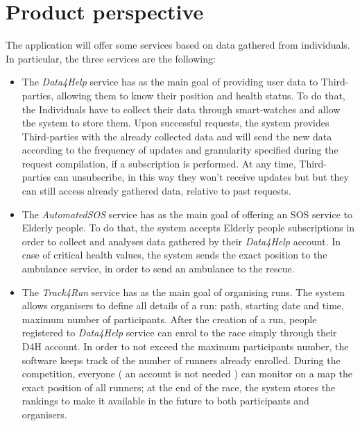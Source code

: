 \section{Product perspective}

The application will offer some services based on data gathered from individuals. In particular, the three services are the following:

\begin{itemize}
    \item The \emph{Data4Help} service has as the main goal of providing user data to Third-parties, allowing them to know their position and health status.
    To do that, the Individuals have to collect their data through smart-watches and allow the system to store them. Upon successful requests, the system provides Third-parties with the already collected data and will send the new data according to the frequency of updates and granularity specified during the request compilation, if a subscription is performed.
    At any time, Third-parties can unsubscribe, in this way they won't receive updates but but they can still access already gathered data, relative to past requests.
    \item The \emph{AutomatedSOS} service has as the main goal of offering an SOS service to Elderly people. To do that, the system accepts Elderly people subscriptions in order to collect and analyses data gathered by their \emph{Data4Help} account. In case of critical health values, the system sends the exact position to the ambulance service, in order to send an ambulance to the rescue.
    \item The \emph{Track4Run} service has as the main goal of organising runs. The system allows organisers to define all details of a run: path, starting date and time, maximum number of participants. After the creation of a run, people registered to \emph{Data4Help} service can enrol to the race simply through their D4H account. In order to not exceed the maximum participants number, the software keeps track of the number of runners already enrolled. During the competition, everyone ( an account is not needed ) can monitor on a map the exact position of all runners; at the end of the race, the system stores the rankings to make it available in the future to both participants and organisers. 
\end{itemize}


